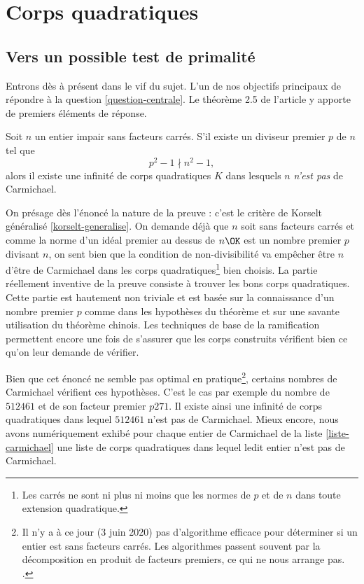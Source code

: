 \section{Corps quadratiques}

\subsection{Vers un possible test de primalité}

Entrons dès à présent dans le vif du sujet. L'un de nos objectifs principaux de répondre à la question \ref{question-centrale}. Le théorème 2.5 de l'article y apporte de premiers éléments de réponse.

\begin{theoreme}
	Soit $n$ un entier impair sans facteurs carrés. S'il existe un diviseur premier $p$ de $n$ tel que $$p^2 - 1 \nmid n^2 - 1,$$ alors il existe une infinité de corps quadratiques $K$ dans lesquels $n$ \emph{n'est pas} de Carmichael.
\end{theoreme}

\begin{MotSurPreuve}
	On présage dès l'énoncé la nature de la preuve : c'est le critère de Korselt généralisé \ref{korselt-generalise}. On demande déjà que $n$ soit sans facteurs carrés et comme la norme d'un idéal premier au dessus de $n\OK$ est un nombre premier $p$ divisant $n$, on sent bien que la condition de non-divisibilité va empêcher être $n$ d'être de Carmichael dans les corps quadratiques\footnote{Les carrés ne sont ni plus ni moins que les normes de $p$ et de $n$ dans toute extension quadratique.} bien choisis. La partie réellement inventive de la preuve consiste à trouver les bons corps quadratiques. Cette partie est hautement non triviale et est basée sur la connaissance d'un nombre premier $p$ comme dans les hypothèses du théorème et sur une savante utilisation du théorème chinois. Les techniques de base de la ramification permettent encore une fois de s'assurer que les corps construits vérifient bien ce qu'on leur demande de vérifier. \\
\end{MotSurPreuve}

Bien que cet énoncé ne semble pas optimal en pratique\footnote{Il n'y a à ce jour (3 juin 2020) pas d'algorithme efficace pour déterminer si un entier est sans facteurs carrés. Les algorithmes passent souvent par la décomposition en produit de facteurs premiers, ce qui ne nous arrange pas. .}, certains nombres de Carmichael vérifient ces hypothèses. C'est le cas par exemple du nombre de $512461$ et de son facteur premier $p271$. Il existe ainsi une infinité de corps quadratiques dans lequel $512461$ n'est pas de Carmichael. Mieux encore, nous avons numériquement exhibé pour chaque entier de Carmichael de la liste \ref{liste-carmichael} une liste de corps quadratiques dans lequel ledit entier n'est pas de Carmichael.  \\

